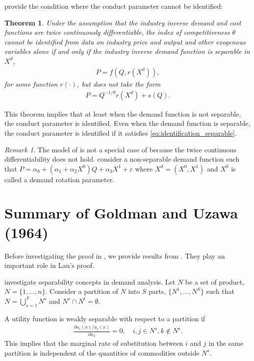 \documentclass[11pt, a4paper]{article}
\newtheorem{theorem}{Theorem}
\theoremstyle{remark}
\newtheorem{remark}{Remark}
\begin{document}
\citet{lau1982identifying} provide the condition where the conduct parameter cannot be identified:
\begin{theorem}\label{theorem_lau}
    Under the assumption that the industry inverse demand and cost functions are twice continuously differentiable, the index of competitiveness $\theta$ cannot be identified from data on industry price and output and other exogenous variables alone if and only if the industry inverse demand function is separable in $X^{d}$, 
    \begin{align}
        P = f(Q, r(X^{d})), \label{eq:demand_separable}
    \end{align}
    for some function $r(\cdot)$, but does not take the form
    \begin{align}
        P = Q^{-1/\theta}r(X^{d}) + s(Q). \label{eq:identification_separable}
    \end{align}
\end{theorem}
This theorem implies that at least when the demand function is not separable, the conduct parameter is identified.
Even when the demand function is separable, the conduct parameter is identified if it satisfies \eqref{eq:identification_separable}.

\begin{remark}
    The model of \citet{bresnahan1982oligopoly} is not a special case of \citet{lau1982identifying} because the twice continuous differentiability does not hold.
    \citet{bresnahan1982oligopoly} consider a non-separable demand function such that $P = \alpha_0 + (\alpha_1 + \alpha_2 X^0) Q + \alpha_3 X^1 + \varepsilon$ where $X^{d} = (X^0, X^1)$ and $X^0$ is called a demand rotation parameter.
\end{remark}


\section{Summary of Goldman and Uzawa (1964)}
Before investigating the proof in \citet{lau1982identifying}, we provide results from \citet{goldmanNote1964}.
They play an important role in Lau's proof.

\citet{goldmanNote1964} investigate separability concepts in demand analysis.
Let $N$ be a set of product, $N = \{1,\ldots, n\}$.
Consider a partition of $N$ into $S$ parts, $\{N^1, \ldots, N^S\}$ such that $N = \bigcup_{s=1}^S N^s$ and $N^s \cap N^t = \emptyset$.

A utility function is weakly separable with respect to a partition if 
\begin{align}
    \frac{\partial u_i(x)/ u_j(x)}{\partial x_k} = 0, \quad i,j\in N^s, k \notin N^s.
\end{align}
This implies that the marginal rate of substitution between $i$ and $j$ in the same partition is independent of the quantities of commodities outside $N^s$.
\end{document}
